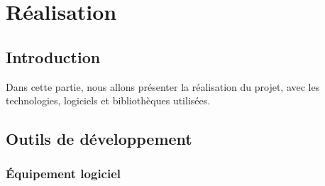 \documentclass{article}
\begin{document}
            
    \section{Réalisation}
        \subsection{Introduction}
            Dans cette partie, nous allons présenter la réalisation du projet, avec les technologies, logiciels et bibliothèques utilisées.
        \subsection{Outils de développement}    
                \subsubsection{Équipement logiciel}
\end{document}
